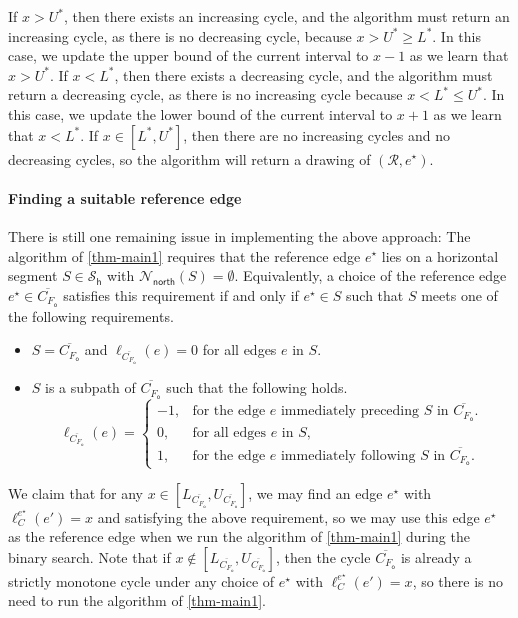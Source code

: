 \documentclass{article}\usepackage[a4paper,margin=20mm]{geometry}
\newcommand{\RR}{\mathcal{R}}
\newcommand{\FO}{F_\mathsf{o}}
\newcommand{\PH}{\mathcal{S}_\mathsf{h}}
\newcommand{\Nnorth}{\mathcal{N}_\mathsf{north}}
\newcommand{\eref}{e^\star}
\begin{document}
If $x > U^\ast$, then there exists an increasing cycle, and the algorithm must return an increasing cycle, as there is no decreasing cycle, because $x > U^\ast \geq L^\ast$. In this case, we update the upper bound of the current interval to $x-1$ as we learn that $x > U^\ast$. If $x <  L^\ast$, then there exists a decreasing cycle, and the algorithm must return a decreasing cycle, as there is no increasing cycle because $x < L^\ast \leq U^\ast$. In this case, we update the lower bound of the current interval to $x+1$ as we learn that $x < L^\ast$. If $x \in [L^\ast, U^\ast]$, then there are no increasing cycles and no decreasing cycles, so the algorithm will return a drawing of $(\RR, \eref)$. 

\paragraph{Finding a suitable reference edge}
There is still one remaining issue in implementing the above approach: The algorithm of \cref{thm-main1} requires that the reference edge $\eref$ lies on a horizontal segment $S \in \PH$ with $\Nnorth(S) = \emptyset$. Equivalently, a choice of the reference edge $\eref \in \overline{C_{\FO}}$ satisfies this requirement if and only if $\eref \in S$ such that $S$ meets  one of the following requirements.
\begin{itemize}
    \item $S = \overline{C_{\FO}}$ and $\ell_{\overline{C_{\FO}}}(e) = 0$ for all edges $e$ in $S$.
    \item $S$ is a subpath of $\overline{C_{\FO}}$ such that the following holds.
    \[
    \ell_{\overline{C_{\FO}}}(e) =\begin{cases}
    -1, & \text{for the edge $e$ immediately preceding $S$ in $\overline{C_{\FO}}$.}\\
    0, & \text{for all edges $e$ in $S$,}\\
    1, & \text{for the edge $e$ immediately following $S$ in $\overline{C_{\FO}}$.}
    \end{cases}
    \]
\end{itemize}

We claim that for any  $x \in  \left[L_{\overline{C_{\FO}}}, U_{\overline{C_{\FO}}}\right]$, we may find an edge $\eref$ with $\ell_C^{\eref}(e') = x$ and satisfying the above requirement, so we may use this edge $\eref$ as the reference edge when we run the algorithm of \cref{thm-main1} during the binary search. Note that if $x \notin \left[L_{\overline{C_{\FO}}}, U_{\overline{C_{\FO}}}\right]$, then the cycle $\overline{C_{\FO}}$ is already a strictly monotone cycle under any choice of $\eref$ with $\ell_C^{\eref}(e') = x$, so there is no need to run the algorithm of \cref{thm-main1}.
\end{document}
